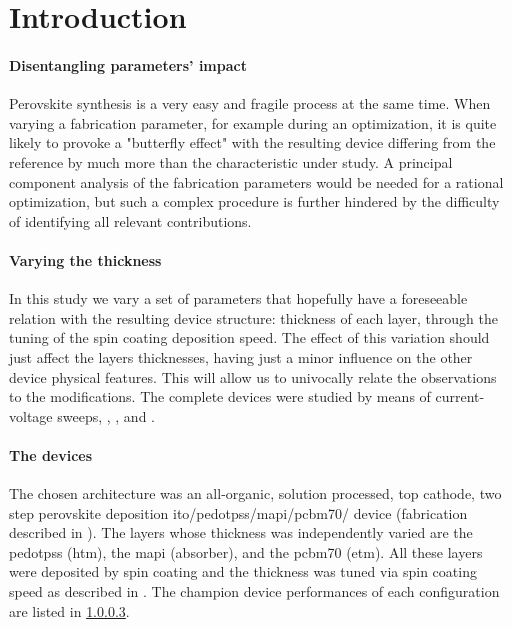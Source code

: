 

\section{Introduction}

	\paragraph{Disentangling parameters' impact}
	Perovskite synthesis is a very easy and fragile process at the same time. When varying a fabrication parameter, for example during an optimization, it is quite likely to provoke a "butterfly effect" with the resulting device differing from the reference by much more than the characteristic under study.
	A principal component analysis of the fabrication parameters would be needed for a rational optimization, but such a complex procedure is further hindered by the difficulty of identifying all relevant contributions.

	\paragraph{Varying the thickness}
	In this study we vary a set of parameters that hopefully have a foreseeable relation with the resulting device structure: thickness of each layer, through the tuning of the spin coating deposition speed.
	The effect of this variation should just affect the layers thicknesses, having just a minor influence on the other device physical features.
	This will allow us to univocally relate the observations to the modifications.
	The complete devices were studied by means of current-voltage sweeps, , , and .

	\paragraph{The devices}
	The chosen architecture was an all-organic, solution processed, top cathode, two step perovskite deposition \gls{ito}\-/\gls{pedotpss}\-/\gls{mapi}\-/\gls{pcbm70}\-/ device (fabrication described in ).
	The layers whose thickness was independently varied are the \gls{pedotpss} (\gls{htm}), the \gls{mapi} (absorber), and the \gls{pcbm70} (\gls{etm}).
All these layers were deposited by spin coating and the thickness was tuned via spin coating speed as described in .
The champion device performances of each configuration are listed in \cref{}.

